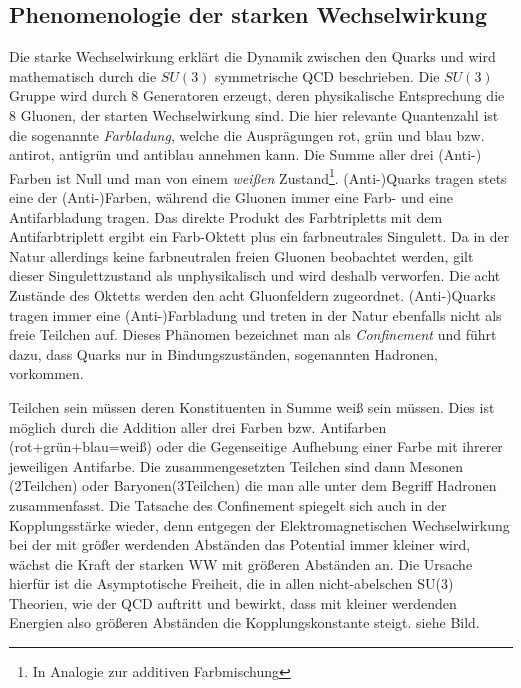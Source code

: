 \subsection{Phenomenologie der starken Wechselwirkung}
Die starke Wechselwirkung erklärt die Dynamik zwischen den Quarks und wird
mathematisch durch die $SU(3)$ symmetrische \ac{QCD} beschrieben. Die $SU(3)$
Gruppe wird durch 8 Generatoren erzeugt, deren physikalische Entsprechung die 8
Gluonen, der starten Wechselwirkung sind. Die hier relevante Quantenzahl ist
die sogenannte \textit{Farbladung}, welche die Ausprägungen rot, grün und blau
bzw. antirot, antigrün und antiblau annehmen kann. Die Summe aller drei (Anti-)
Farben ist Null und man von einem \textit{weißen} Zustand\footnote{In Analogie
zur additiven Farbmischung}. (Anti-)Quarks tragen stets eine der (Anti-)Farben,
während die Gluonen immer eine Farb- und eine Antifarbladung tragen. Das
direkte Produkt des Farbtripletts mit dem Antifarbtriplett ergibt ein
Farb-Oktett plus ein farbneutrales Singulett. Da in der Natur allerdings keine
farbneutralen freien Gluonen beobachtet werden, gilt dieser Singulettzustand
als unphysikalisch und wird deshalb verworfen. Die acht Zustände des Oktetts
werden den acht Gluonfeldern zugeordnet. (Anti-)Quarks tragen immer eine
(Anti-)Farbladung und treten in der Natur ebenfalls nicht als freie Teilchen
auf. Dieses Phänomen bezeichnet man als \textit{Confinement} und führt dazu,
dass Quarks nur in Bindungszuständen, sogenannten Hadronen, vorkommen.

\development
Teilchen sein müssen deren Konstituenten in Summe weiß sein müssen. Dies ist
möglich durch die Addition aller drei Farben bzw. Antifarben
(rot+grün+blau=weiß) oder die Gegenseitige Aufhebung einer Farbe mit ihrerer
jeweiligen Antifarbe. Die zusammengesetzten Teilchen sind dann Mesonen
(2Teilchen) oder Baryonen(3Teilchen) die man alle unter dem Begriff Hadronen
zusammenfasst.
Die Tatsache des Confinement spiegelt sich auch in der Kopplungsstärke wieder,
denn entgegen der Elektromagnetischen Wechselwirkung bei der mit größer
werdenden Abständen das Potential immer kleiner wird, wächst die Kraft der
starken WW mit größeren Abständen an. Die Ursache hierfür ist die Asymptotische
Freiheit, die in allen nicht-abelschen SU(3) Theorien, wie der QCD auftritt und
bewirkt, dass mit kleiner werdenden Energien also größeren Abständen die
Kopplungskonstante steigt. siehe Bild.

